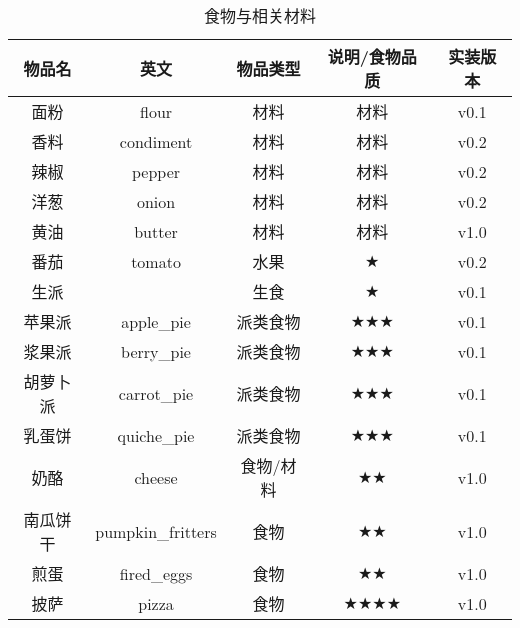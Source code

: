 \begin{table}[H]
    \centering
    \caption{食物与相关材料}
    \setlength{\tabcolsep}{4mm}
    \begin{tabular}{c|cccc}
        \toprule
        \textbf{物品名} & 英文              & \textbf{物品类型} & \textbf{说明/食物品质}                & \textbf{实装版本} \\
        \midrule
        面粉            & flour             & 材料            & 材料   & v0.1              \\
        香料            & condiment         & 材料            & 材料  & v0.2    \\
        辣椒            & pepper            & 材料            & 材料  & v0.2    \\
        洋葱            & onion             & 材料            & 材料  & v0.2    \\
        黄油            & butter            & 材料            & 材料  & v1.0    \\
        \midrule
        番茄            & tomato            & 水果            & $\bigstar$ & v0.2 \\
        \midrule
        生派            &                   & 生食              & $\bigstar$                            & v0.1              \\
        苹果派          & apple\_pie        & 派类食物           & $\bigstar \bigstar \bigstar$         & v0.1              \\
        浆果派          & berry\_pie        & 派类食物           & $\bigstar \bigstar \bigstar$         & v0.1              \\
        胡萝卜派        & carrot\_pie       & 派类食物           & $\bigstar \bigstar \bigstar$         & v0.1              \\
        乳蛋饼          & quiche\_pie       & 派类食物           & $\bigstar \bigstar \bigstar$         & v0.1              \\
        \midrule
        奶酪            & cheese            & 食物/材料         & $\bigstar \bigstar$                  & v1.0               \\
        南瓜饼干        & pumpkin\_fritters & 食物              & $\bigstar \bigstar$                   & v1.0              \\
        煎蛋            & fired\_eggs       & 食物              & $\bigstar \bigstar$                & v1.0              \\
        \midrule
        披萨            & pizza             & 食物              & $\bigstar \bigstar \bigstar \bigstar$ & v1.0              \\
        \bottomrule
    \end{tabular}
\end{table}

